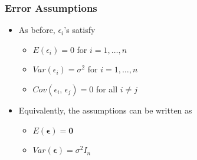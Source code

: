 \documentclass[10pt]{beamer} %
\begin{document}
\begin{frame}
   \frametitle{Error Assumptions}
   \begin{itemize}
      \item As before, $\epsilon_i$'s satisfy
         \begin{itemize}
            \item $E(\epsilon_i) = 0$ for $i= 1,\ldots,n$
               \smallskip
            \item $Var(\epsilon_i)=\sigma^2$ for $i= 1,\ldots,n$
               \smallskip
            \item $Cov(\epsilon_i,\, \epsilon_j) = 0$ for all $i\neq j$
         \end{itemize}
         \bigskip
      \item Equivalently, the assumptions can be written as
         \begin{itemize}
            \item $E\left( \boldsymbol{\epsilon} \right) = \boldsymbol{0}$ 
               \smallskip
            \item $Var(\boldsymbol{\epsilon}) = \sigma^2 I_n$
         \end{itemize}
   \end{itemize}

   
\end{frame}


%
%
%
\end{document}
